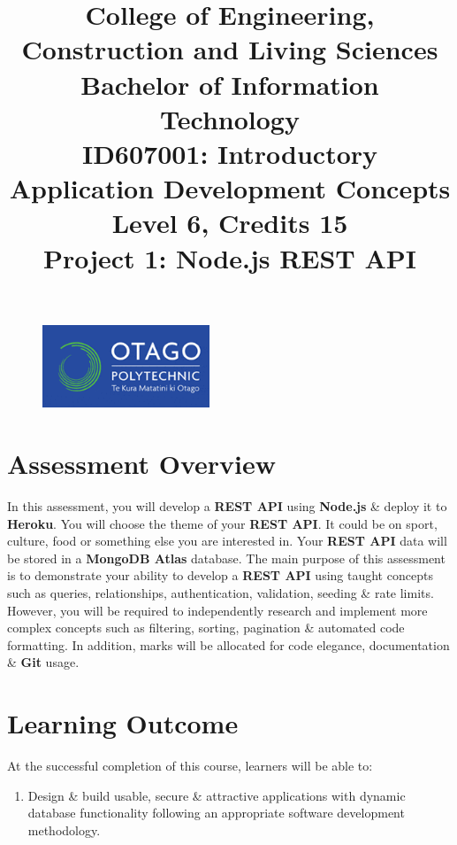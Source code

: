 \documentclass{article}
\author{}
\begin{document}
\begin{figure}
	\centering
	\includegraphics[width=50mm]{../img/logo.png}
\end{figure}

\title{College of Engineering, Construction and Living Sciences\\Bachelor of Information Technology\\ID607001: Introductory Application Development Concepts\\Level 6, Credits 15\\\textbf{Project 1: Node.js REST API}}
\date{}
\maketitle

\section*{Assessment Overview}
In this assessment, you will develop a \textbf{REST API} using \textbf{Node.js} \& deploy it to \textbf{Heroku}. You will choose the theme of your \textbf{REST API}. It could be on sport, culture, food or something else you are interested in. Your \textbf{REST API} data will be stored in a \textbf{MongoDB Atlas} database. The main purpose of this assessment is to demonstrate your ability to develop a \textbf{REST API} using taught concepts such as queries, relationships, authentication, validation, seeding \& rate limits. However, you will be required to independently research and implement more complex concepts such as filtering, sorting, pagination \& automated code formatting. In addition, marks will be allocated for code elegance, documentation \& \textbf{Git} usage.

\section*{Learning Outcome}
At the successful completion of this course, learners will be able to:
\begin{enumerate}
	\item Design \& build usable, secure \& attractive applications with dynamic database functionality following an appropriate software development methodology.
\end{enumerate}
\end{document}
